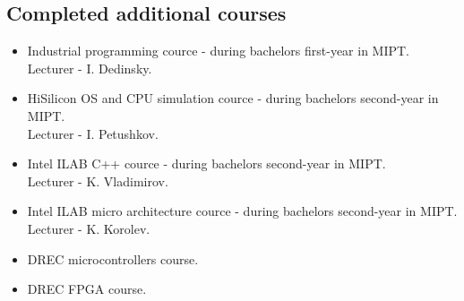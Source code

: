 \subsection* {Completed additional courses}
\begin{itemize}
    \item Industrial programming cource - during bachelors first-year in MIPT. \\
    Lecturer - I. Dedinsky.
    \item HiSilicon OS and CPU simulation cource - during bachelors second-year in MIPT. \\
    Lecturer - I. Petushkov.
    \item Intel ILAB C++ cource - during bachelors second-year in MIPT. \\
    Lecturer - K. Vladimirov.
    \item Intel ILAB micro architecture cource - during bachelors second-year in MIPT. \\
    Lecturer - K. Korolev. \\

    \item DREC microcontrollers course.
    \item DREC FPGA course.
\end{itemize}
